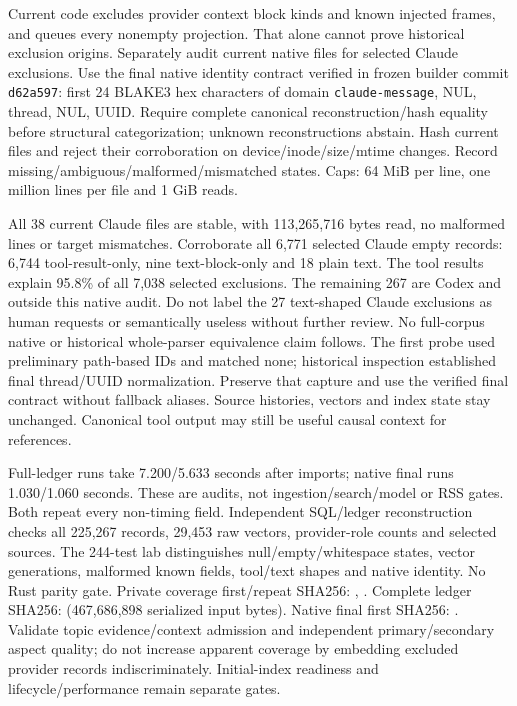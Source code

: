 \documentclass[11pt]{article}
\begin{document}
Current code excludes provider context block kinds and known injected frames,
and queues every nonempty projection. That alone cannot prove historical exclusion
origins. Separately audit current native files for selected Claude exclusions.
Use the final native identity contract verified in frozen builder commit
\texttt{d62a597}: first 24 BLAKE3 hex characters of domain
\texttt{claude-message}, NUL, thread, NUL, UUID. Require complete canonical
reconstruction/hash equality before structural categorization; unknown
reconstructions abstain. Hash current files and reject their corroboration on
device/inode/size/mtime changes. Record missing/ambiguous/malformed/mismatched
states. Caps: 64 MiB per line, one million lines per file and 1 GiB reads.

All 38 current Claude files are stable, with 113,265,716 bytes read, no malformed
lines or target mismatches. Corroborate all 6,771 selected Claude empty records:
6,744 tool-result-only, nine text-block-only and 18 plain text. The tool results
explain 95.8\% of all 7,038 selected exclusions. The remaining 267 are Codex and
outside this native audit. Do not label the 27 text-shaped Claude exclusions as
human requests or semantically useless without further review. No full-corpus
native or historical whole-parser equivalence claim follows. The first probe
used preliminary path-based IDs and matched none; historical inspection established
final thread/UUID normalization. Preserve that capture and use the verified final
contract without fallback aliases. Source histories, vectors and index state stay
unchanged. Canonical tool output may still be useful causal context for references.

Full-ledger runs take 7.200/5.633 seconds after imports; native final runs
1.030/1.060 seconds. These are audits, not ingestion/search/model or RSS gates.
Both repeat every non-timing field. Independent SQL/ledger reconstruction checks
all 225,267 records, 29,453 raw vectors, provider-role counts and selected sources.
The 244-test lab distinguishes null/empty/whitespace states, vector generations,
malformed known fields, tool/text shapes and native identity. No Rust parity gate.
Private coverage first/repeat SHA256:
,
.
Complete ledger SHA256:
(467,686,898 serialized input bytes). Native final first SHA256:
.
Validate topic evidence/context admission and independent primary/secondary
aspect quality; do not increase apparent coverage by embedding excluded provider
records indiscriminately. Initial-index readiness and lifecycle/performance remain
separate gates.
\end{document}
